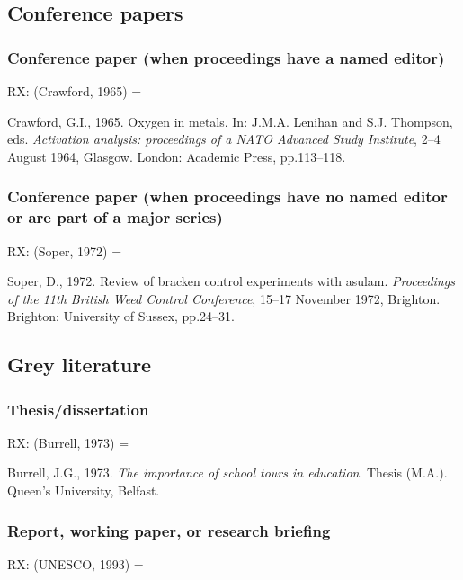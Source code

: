 \subsection{Conference papers}

\subsubsection*{Conference paper (when proceedings have a named editor)}

RX: (Crawford, 1965) = \cite{crawford1965oim}

Crawford, G.I., 1965. Oxygen in metals. In: J.M.A. Lenihan and S.J. Thompson, eds. \emph{Activation analysis: proceedings of a NATO Advanced Study Institute}, 2--4 August 1964, Glasgow. London: Academic Press, pp.113--118.



\subsubsection*{Conference paper (when proceedings have no named editor or are part of a major series)}

RX: (Soper, 1972) = \cite{soper1972rbc}

Soper, D., 1972. Review of bracken control experiments with asulam. \emph{Proceedings of the 11th British Weed Control Conference}, 15--17 November 1972, Brighton. Brighton: University of Sussex, pp.24--31.



\subsection{Grey literature}

\subsubsection*{Thesis/dissertation}

RX: (Burrell, 1973) = \cite{burrell1973ist}

Burrell, J.G., 1973. \emph{The importance of school tours in education}. Thesis (M.A.). Queen's University, Belfast.



\subsubsection*{Report, working paper, or research briefing}

RX: (UNESCO, 1993) = \cite{unesco1993gip}

